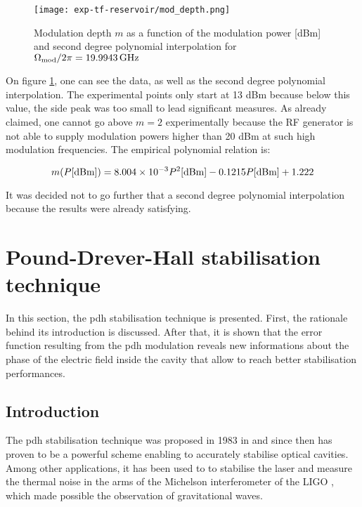 \begin{figure}
	\centering
	\texttt{[image: exp-tf-reservoir/mod\_depth.png]}
	\caption{Modulation depth $m$ as a function of the modulation power [dBm] and second degree polynomial interpolation for $\Omega_{\text{mod}}/2\pi=\SI{19.9943}{\giga\hertz}$}
	\label{mod_depth}
\end{figure}

On figure \ref{mod_depth}, one can see the data, as well as the second degree polynomial interpolation. The experimental points only start at 13 dBm because below this value, the side peak was too small to lead significant measures. As already claimed, one cannot go above $m = 2$ experimentally because the RF generator is not able to supply modulation powers higher than 20 dBm at such high modulation frequencies. The empirical polynomial relation is:

\begin{equation}
	m(P[\textrm{dBm}]) = \num{8.004d-3} P^2[\textrm{dBm}] - 0.1215 P[\textrm{dBm}] + 1.222
\end{equation}

It was decided not to go further that a second degree polynomial interpolation because the results were already satisfying.


\section{Pound-Drever-Hall stabilisation technique}

\label{sec-pdh}

In this section, the \gls{pdh} stabilisation technique is presented. First, the rationale behind its introduction is discussed. After that, it is shown that the error function resulting from the \gls{pdh} modulation reveals new informations about the phase of the electric field inside the cavity that allow to reach better stabilisation performances.


\subsection{Introduction}

The \gls{pdh} stabilisation technique was proposed in 1983 in \cite{drever1983laser} and since then has proven to be a powerful scheme enabling to accurately stabilise optical cavities. Among other applications, it has been used to to stabilise the laser and measure the thermal noise in the arms of the Michelson interferometer of the LIGO \cite{black1998notes}, which made possible the observation of gravitational waves.\\

